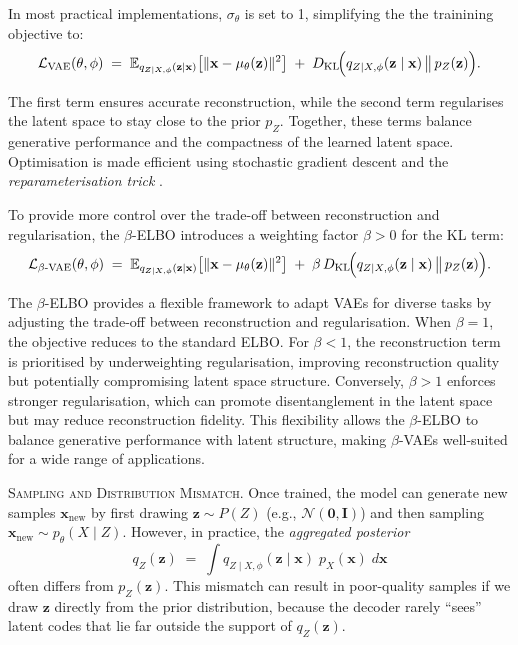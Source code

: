 In most practical implementations, \(\sigma_\theta\) is set to 1, simplifying the the trainining objective to:
\[
\mathcal{L}_{\text{VAE}}(\theta, \phi)
\;=\;
\mathbb{E}_{q_{Z \mid X, \phi}(\mathbf{z} \mid \mathbf{x})}
\bigl[\|\mathbf{x} - \mu_\theta(\mathbf{z})\|^2\bigr]
\;+\;
D_{\mathrm{KL}}\!\Bigl(
    q_{Z \mid X,\phi}(\mathbf{z}\mid \mathbf{x})
    \,\bigl\|\,
    p_{Z}(\mathbf{z})
\Bigr).
\]

The first term ensures accurate reconstruction, while the second term regularises the latent space to stay close to the prior \(p_Z\). Together, these terms balance generative performance and the compactness of the learned latent space. Optimisation is made efficient using stochastic gradient descent and the \emph{reparameterisation trick} \citep{kingma2013auto}.

To provide more control over the trade-off between reconstruction and regularisation, the \(\beta\)-ELBO \citep{higgins2017beta} introduces a weighting factor \(\beta > 0\) for the KL term:
\[
\mathcal{L}_{\beta\text{-VAE}}(\theta, \phi)
\;=\;
\mathbb{E}_{q_{Z \mid X, \phi}(\mathbf{z} \mid \mathbf{x})}
\bigl[\|\mathbf{x} - \mu_\theta(\mathbf{z})\|^2\bigr]
\;+\;
\beta \, D_{\mathrm{KL}}\!\Bigl(
    q_{Z \mid X,\phi}(\mathbf{z}\mid \mathbf{x})
    \,\bigl\|\,
    p_{Z}(\mathbf{z})
\Bigr).
\]

The \(\beta\)-ELBO provides a flexible framework to adapt VAEs for diverse tasks by adjusting the trade-off between reconstruction and regularisation. When \(\beta = 1\), the objective reduces to the standard ELBO. For \(\beta < 1\), the reconstruction term is prioritised by underweighting regularisation, improving reconstruction quality but potentially compromising latent space structure. Conversely, \(\beta > 1\) enforces stronger regularisation, which can promote disentanglement in the latent space but may reduce reconstruction fidelity. This flexibility allows the \(\beta\)-ELBO to balance generative performance with latent structure, making \(\beta\)-VAEs well-suited for a wide range of applications.

\textsc{Sampling and Distribution Mismatch.} Once trained, the model can generate new samples \(\mathbf{x}_{\text{new}}\) by first drawing \(\mathbf{z} \sim P(Z)\) (e.g., \(\mathcal{N}(\mathbf{0}, \mathbf{I})\)) and then sampling \(\mathbf{x}_{\text{new}} \sim p_{\theta}(X \mid Z)\). However, in practice, the \emph{aggregated posterior}
\[
q_{Z}(\mathbf{z}) 
\;=\;
\int
q_{Z \mid X,\phi}(\mathbf{z}\mid \mathbf{x})
\;p_{X}(\mathbf{x})
\;d\mathbf{x}
\]
often differs from \(p_{Z}(\mathbf{z})\). This mismatch can result in poor-quality samples if we draw \(\mathbf{z}\) directly from the prior distribution, because the decoder rarely “sees” latent codes that lie far outside the support of \(q_{Z}(\mathbf{z})\).

